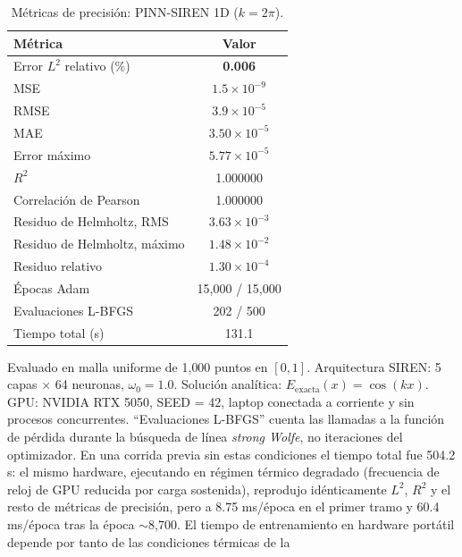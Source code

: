 \begin{table}[htbp]
\centering
\begin{threeparttable}
\caption{Métricas de precisión: PINN-SIREN 1D ($k = 2\pi$).}
\label{tab:resultados1d}
\begin{tabular}{lc}
\toprule
Métrica & Valor \\
\midrule
Error $L^2$ relativo (\%)    & \textbf{0.006} \\
MSE                          & $1.5 \times 10^{-9}$ \\
RMSE                         & $3.9 \times 10^{-5}$ \\
MAE                          & $3.50 \times 10^{-5}$ \\
Error máximo                 & $5.77 \times 10^{-5}$ \\
$R^2$                        & 1.000000 \\
Correlación de Pearson       & 1.000000 \\
\midrule
Residuo de Helmholtz, RMS    & $3.63 \times 10^{-3}$ \\
Residuo de Helmholtz, máximo & $1.48 \times 10^{-2}$ \\
Residuo relativo             & $1.30 \times 10^{-4}$ \\
\midrule
Épocas Adam                  & 15{,}000 / 15{,}000 \\
Evaluaciones L-BFGS          & 202 / 500 \\
Tiempo total (s)             & 131.1 \\
\bottomrule
\end{tabular}
\begin{tablenotes}\small
    \item Evaluado en malla uniforme de 1{,}000 puntos en $[0,1]$.
    Arquitectura SIREN: 5 capas $\times$ 64 neuronas, $\omega_0 = 1.0$.
    Solución analítica: $E_\text{exacta}(x) = \cos(kx)$.
    GPU: NVIDIA RTX 5050, SEED = 42, laptop conectada a corriente y sin
    procesos concurrentes. ``Evaluaciones L-BFGS'' cuenta las llamadas a la
    función de pérdida durante la búsqueda de línea \textit{strong Wolfe},
    no iteraciones del optimizador. En una corrida previa sin estas
    condiciones el tiempo total fue 504.2 s: el mismo hardware, ejecutando
    en régimen térmico degradado (frecuencia de reloj de GPU reducida por
    carga sostenida), reprodujo idénticamente $L^2$, $R^2$ y el resto de
    métricas de precisión, pero a 8.75 ms/época en el primer tramo y
    60.4 ms/época tras la época $\sim$8{,}700. El tiempo de entrenamiento en
    hardware portátil depende por tanto de las condiciones térmicas de la

\end{tablenotes}
\end{threeparttable}
\end{table}
